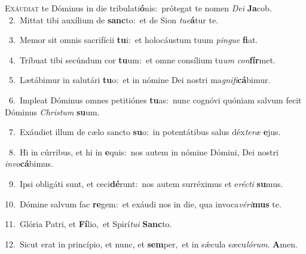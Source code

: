 \lettrine{\initial\textcolor{\initialcolor}{E}}{xáudiat} te Dóminus in die tribulati\-\textbf{ó}\-nis:~\star prótegat te nomen \textit{De}\-\textit{i} \textbf{Ja}\-cob.\\
{\numbfont\textcolor{\numbcolor}{~2.}}~Mittat tibi auxílium de \textbf{sanc}\-to:~\star et de Sion \textit{tu}\-\textit{e}\textbf{á}tur te.\par
{\numbfont\textcolor{\numbcolor}{~3.}}~Memor sit omnis sacrifícii \textbf{tu}\-i:~\star et holocáustum tuum \textit{pin}\-\textit{gue} \textbf{fi}\-at.\par
{\numbfont\textcolor{\numbcolor}{~4.}}~Tríbuat tibi secúndum cor \textbf{tu}\-um:~\star et omne consílium tu\textit{um} \textit{con}\-\textbf{fír}met.\par
{\numbfont\textcolor{\numbcolor}{~5.}}~Lætábimur in salutári \textbf{tu}\-o:~\star et in nómine Dei nostri ma\-\textit{gni}\-\textit{fi}\textbf{cá}bimur.\par
{\numbfont\textcolor{\numbcolor}{~6.}}~Impleat Dóminus omnes petitiónes \textbf{tu}\-as:~\star nunc cognóvi quóniam salvum fecit Dóminus \textit{Chris}\-\textit{tum} \textbf{su}\-um.\par
{\numbfont\textcolor{\numbcolor}{~7.}}~Exáudiet illum de cælo sancto \textbf{su}\-o:~\star in potentátibus salus déx\-\textit{te}\-\textit{ræ} \textbf{e}\-jus.\par
{\numbfont\textcolor{\numbcolor}{~8.}}~Hi in cúrribus, et hi in \textbf{e}\-quis:~\star nos autem in nómine Dómini, Dei nostri \textit{in}\-\textit{vo}\textbf{cá}bimus.\par
{\numbfont\textcolor{\numbcolor}{~9.}}~Ipsi obligáti sunt, et ceci\-\textbf{dé}\-runt:~\star nos autem surréximus et e\-\textit{réc}\-\textit{ti} \textbf{su}\-mus.\par
{\numbfont\textcolor{\numbcolor}{10.}}~Dómine salvum fac \textbf{re}\-gem:~\star et exáudi nos in die, qua invoca\-\textit{vé}\-\textit{ri}\textbf{mus} te.\par
{\numbfont\textcolor{\numbcolor}{11.}}~Glória Patri, et \textbf{Fí}\-lio,~\star et Spirí\-\textit{tu}\-\textit{i} \textbf{Sanc}\-to.\par
{\numbfont\textcolor{\numbcolor}{12.}}~Sicut erat in princípio, et nunc, et \textbf{sem}\-per,~\star et in sǽcula sæcu\-\textit{ló}\-\textit{rum}. \textbf{A}\-men.\par
